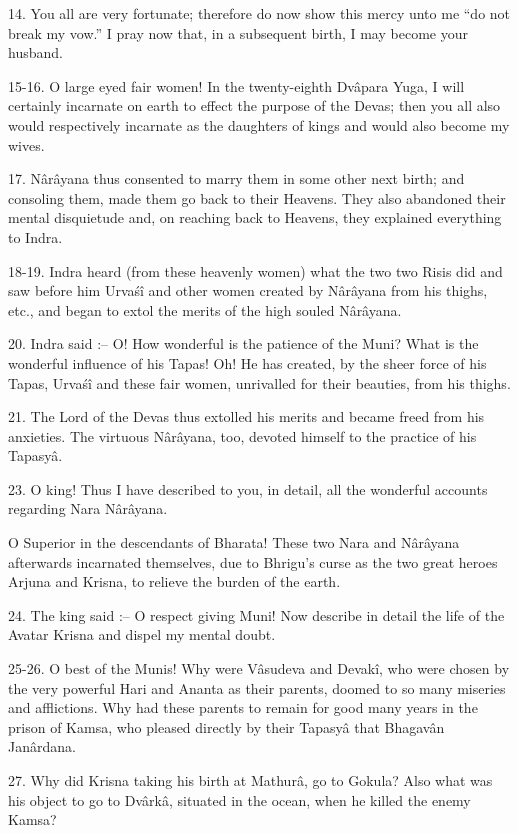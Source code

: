 14. You all are very fortunate; therefore do now show this mercy unto me ``do not break my vow.'' I pray now that, in a subsequent birth, I may become your husband.

15-16. O large eyed fair women! In the twenty-eighth Dv\^apara Yuga, I will certainly incarnate on earth to effect the purpose of the Devas; then you all also would respectively incarnate as the daughters of kings and would also become my wives.

17. N\^ar\^ayana thus consented to marry them in some other next birth; and consoling them, made them go back to their Heavens. They also abandoned their mental disquietude and, on reaching back to Heavens, they explained everything to Indra.

18-19. Indra heard (from these heavenly women) what the two two Risis did and saw before him Urva\'s\^i and other women created by N\^ar\^ayana from his thighs, etc., and began to extol the merits of the high souled N\^ar\^ayana.

20. Indra said :-- O! How wonderful is the patience of the Muni? What is the wonderful influence of his Tapas! Oh! He has created, by the sheer force of his Tapas, Urva\'s\^i and these fair women, unrivalled for their beauties, from his thighs.

21. The Lord of the Devas thus extolled his merits and became freed from his anxieties. The virtuous N\^ar\^ayana, too, devoted himself to the practice of his Tapasy\^a.

23. O king! Thus I have described to you, in detail, all the wonderful accounts regarding Nara N\^ar\^ayana.

O Superior in the descendants of Bharata! These two Nara and N\^ar\^ayana afterwards incarnated themselves, due to Bhrigu's curse as the two great heroes Arjuna and Krisna, to relieve the burden of the earth.

24. The king said :-- O respect giving Muni! Now describe in detail the life of the Avatar Krisna and dispel my mental doubt.

25-26. O best of the Munis! Why were V\^asudeva and Devak\^i, who were chosen by the very powerful Hari and Ananta as their parents, doomed to so many miseries and afflictions. Why had these parents to remain for good many years in the prison of Kamsa, who pleased directly by their Tapasy\^a that Bhagav\^an Jan\^ardana.

27. Why did Krisna taking his birth at Mathur\^a, go to Gokula? Also what was his object to go to Dv\^ark\^a, situated in the ocean, when he killed the enemy Kamsa?

